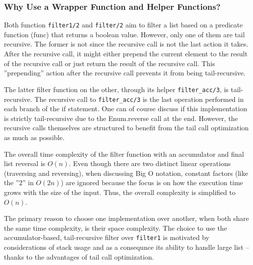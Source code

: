 \documentclass[a4paper,11pt]{article}
\begin{document}
\subsubsection*{Why Use a Wrapper Function and Helper Functions?}
Both function
\texttt{filter1/2} and
\texttt{filter/2} aim to filter a list based on a predicate function (func)
that returns a boolean value.
However, only one of them are tail recursive.
The former is not since the recursive call is not the last action it takes.
After the recursive call, it might either prepend the current element to the
result of the recursive call or just return the result of the recursive call.
This ''prepending'' action after the recursive call prevents it from being tail-recursive.

The latter filter function on the other,
through its helper
\texttt{filter_acc/3}, is tail-recursive.
The recursive call to
\texttt{filter_acc/3} is the last operation performed
in each branch of the if statement.
One can of course discuss if this implementation is strictly tail-recursive due to the Enum.reverse call at the end.
However, the recursive calls themselves are structured to benefit from the tail call optimization as much as possible.

The overall time complexity of the
filter function with an accumulator and final list reversal is $O(n)$.
Even though there are two distinct linear operations (traversing and reversing),
when discussing Big O notation,
constant factors (like the ''$2$'' in $O(2n)$) are ignored because the focus is
on how the execution time grows with the size of the input.
Thus, the overall complexity is simplified to $O(n)$.

The primary reason to choose one implementation over another,
when both share the same time complexity,
is their space complexity.
The choice to use the accumulator-based,
tail-recursive filter over
\texttt{filter1} is motivated by considerations of stack usage
and as a consequnce its ability to handle large list -- thanks to the advantages of tail call optimization.
\end{document}
